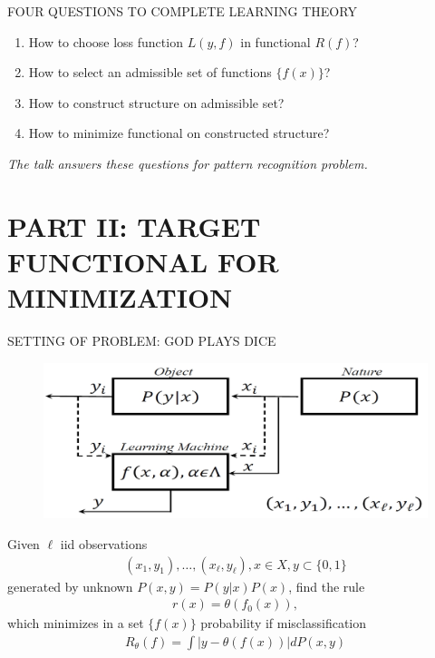 \documentclass[11pt]{beamer}
\begin{document}
\begin{frame}{FOUR QUESTIONS TO COMPLETE LEARNING THEORY}
\begin{enumerate}
\item How to choose loss function $L(y, f)$ in functional $R(f)$?
\item How to select an admissible set of functions $\{f(x)\}$?
\item How to construct structure on admissible set?
\item How to minimize functional on constructed structure?
\end{enumerate}

\begin{center}
\emph{The talk answers these questions for pattern recognition problem.}
\end{center}
\end{frame}

\section{PART II: TARGET FUNCTIONAL FOR MINIMIZATION}
\begin{frame}
{\color{blue}{
\begin{center}
PART II
\end{center}
\begin{center}
TARGET FUNCTIONAL FOR MINIMIZATION
\end{center}
}}
\end{frame}

\begin{frame}{SETTING OF PROBLEM: GOD PLAYS DICE}
\begin{figure}
\includegraphics[width=.6\linewidth]{Imgs/slt.png}
\end{figure}

Given $\ell$ iid observations
\begin{align*}
(x_{1}, y_{1}), \ldots, (x_{\ell}, y_{\ell}), x \in X, y \subset \{0, 1\}
\end{align*}
generated by unknown $P(x, y) = P(y|x)P(x)$, find the rule
\begin{align*}
r(x) = \theta(f_{0}(x)),
\end{align*}
which minimizes in a set $\{f(x)\}$ probability if misclassification
\begin{align*}
R_{\theta }(f) = \int |y - \theta(f(x))|dP(x,y)
\end{align*}
\end{frame}
\end{document}
